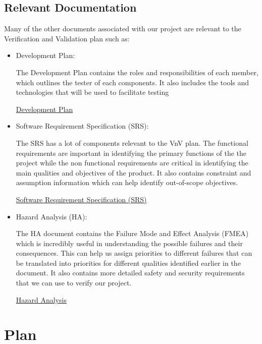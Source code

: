 \documentclass[12pt, titlepage]{article}
\begin{document}
\subsection{Relevant Documentation}

Many of the other documents associated with our project are relevant to the Verification and Validation plan such as:

\begin{itemize}
	\item Development Plan:

	The Development Plan contains the roles and responsibilities of each member, which outlines the tester of each components. It also includes the tools and technologies that will be used to facilitate testing

	\href{https://github.com/beatlepie/4G06CapstoneProjectTeam2/blob/docs-VnV-plan/docs/DevelopmentPlan/DevelopmentPlan.pdf}{Development Plan}
    \item Software Requirement Specification (SRS):
          
          The SRS has a lot of components relevant to the VnV plan. The functional requirements are important in identifying the primary functions of the the project while the non functional requirements are critical in identifying the main qualities and objectives of the product. It also contains constraint and assumption information which can help identify out-of-scope objectives.

          \href{https://github.com/beatlepie/4G06CapstoneProjectTeam2/blob/docs-VnV-plan/docs/SRS/SRS.pdf}{Software Requirement Specification (SRS)}
    \item Hazard Analysis (HA):
    
        The HA document contains the Failure Mode and Effect Analysis (FMEA) which is incredibly useful in understanding the possible failures and their consequences. This can help us assign priorities to different failures that can be translated into priorities for different qualities identified earlier in the document. It also contains more detailed safety and security requirements that we can use to verify our project.

        \href{https://github.com/beatlepie/4G06CapstoneProjectTeam2/blob/docs-VnV-plan/docs/HazardAnalysis/HazardAnalysis.pdf}{Hazard Analysis}
\end{itemize}


\section{Plan}
\end{document}
